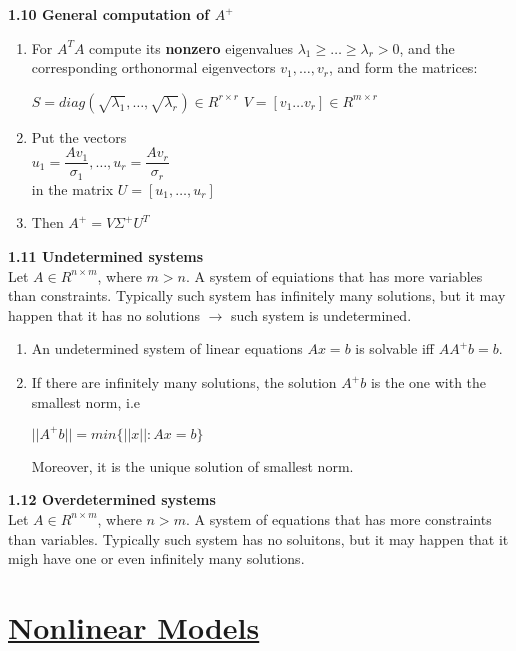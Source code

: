 \documentclass{article}
\begin{document}
\begin{multicols}{3}
\textbf{1.10 General computation of $A^+$}
\begin{enumerate}
    \item For $A^TA$ compute its \textbf{nonzero} eigenvalues
        $\lambda_1 \geq \dots \geq \lambda_r > 0$, and the corresponding
        orthonormal eigenvectors $v_1, \dots, v_r$, and form the matrices:
        \begin{center}
            \begin{math}
                S = diag(\sqrt{\lambda_1}, \dots, \sqrt{\lambda_r}) \in R^{r \times r}
            \end{math}
            \begin{math}
                V = [v_1 \dots v_r] \in R^{m \times r}
            \end{math}
        \end{center}
    \item Put the vectors \\
         \begin{math}
             u_1 = \dfrac{Av_1}{\sigma_1}, \dots, u_r = \dfrac{Av_r}{\sigma_r}
        \end{math}\\ 
        in the matrix $U = [u_1, \dots, u_r]$
    \item Then $A^+ = V \Sigma^+ U^T$
\end{enumerate}

\textbf{1.11 Undetermined systems}\\
Let $A \in R^{n \times m}$, where $m > n$. A system of equiations that has more variables than
constraints. Typically such system has infinitely many solutions, but it may happen that it has no
solutions $\rightarrow$ such system is undetermined.
\begin{enumerate}
    \item An undetermined system of linear equations $Ax=b$ is solvable iff $AA^+b = b$.
    \item If there are infinitely many solutions, the solution $A^+b$ is the one with the
        smallest norm, i.e
        \begin{center}
            \begin{math}
                || A^+ b || = min\{||x||: Ax = b\}
            \end{math}
        \end{center}
        Moreover, it is the unique solution of smallest norm.
\end{enumerate}

\textbf{1.12 Overdetermined systems}\\
Let $A \in R^{n \times m}$, where $n > m$. A system of equations that has more constraints than
variables. Typically such system has no soluitons, but it may happen that it migh have one or
even infinitely many solutions.

\section{\underline{Nonlinear Models}}

\end{multicols}
\end{document}
